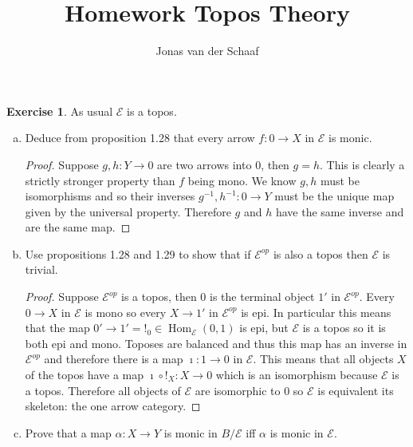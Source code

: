 \documentclass{article}
\title{Homework Topos Theory}
\author{Jonas van der Schaaf}
\date{}
\DeclareMathOperator{\Hom}{Hom}
\newcommand{\topos}{\mathcal{E}}
\theoremstyle{definition}
\newtheorem{question}{Exercise}
\begin{document}
\maketitle

\begin{question}
    As usual \(\topos\) is a topos.
    \begin{enumerate}[(a)]
        \item Deduce from proposition 1.28 that every arrow \(f:0\to X\) in
              \(\topos\) is monic.

              \begin{proof}
                  Suppose \(g,h:Y\to 0\) are two arrows into \(0\), then
                  \(g=h\). This is clearly a strictly stronger property than
                  \(f\) being mono. We know \(g,h\) must be isomorphisms and so
                  their inverses \(g^{-1},h^{-1}:0\to Y\) must be the unique map
                  given by the universal property. Therefore \(g\) and \(h\)
                  have the same inverse and are the same map.
              \end{proof}

        \item Use propositions 1.28 and 1.29 to show that if \(\topos^{op}\) is
              also a topos then \(\topos\) is trivial.

              \begin{proof}
                  Suppose \(\topos^{op}\) is a topos, then \(0\) is the terminal
                  object \(1'\) in \(\topos^{op}\). Every \(0\to X\) in
                  \(\topos\) is mono so every \(X\to 1'\) in \(\topos^{op}\) is
                  epi. In particular this means that the map \(0'\to
                  1'=!_{0}\in\Hom_{\topos}(0,1)\) is epi, but \(\topos\) is a
                  topos so it is both epi and mono. Toposes are balanced and
                  thus this map has an inverse in \(\topos^{op}\) and therefore
                  there is a map \(\imath:1\to 0\) in \(\topos\). This means
                  that all objects \(X\) of the topos have a map \(\imath\circ
                  !_{X}:X\to 0\) which is an isomorphism because \(\topos\) is a
                  topos. Therefore all objects of \(\topos\) are isomorphic to
                  \(0\) so \(\topos\) is equivalent its skeleton: the one arrow
                  category.
              \end{proof}

        \item Prove that a map \(\alpha:X\to Y\) is monic in \(B/\topos\) iff
              \(\alpha\) is monic in \(\topos\).


\end{enumerate}
\end{question}
\end{document}
